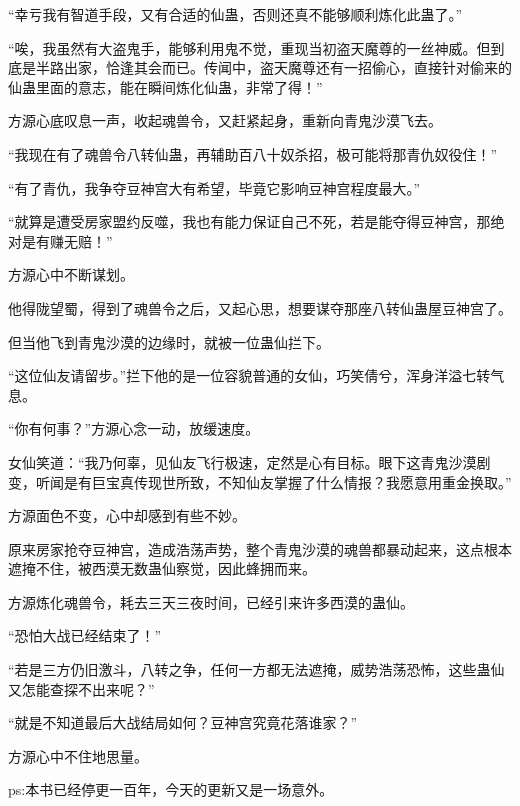 \begin{this_body}
“幸亏我有智道手段，又有合适的仙蛊，否则还真不能够顺利炼化此蛊了。”

“唉，我虽然有大盗鬼手，能够利用鬼不觉，重现当初盗天魔尊的一丝神威。但到底是半路出家，恰逢其会而已。传闻中，盗天魔尊还有一招偷心，直接针对偷来的仙蛊里面的意志，能在瞬间炼化仙蛊，非常了得！”

方源心底叹息一声，收起魂兽令，又赶紧起身，重新向青鬼沙漠飞去。

“我现在有了魂兽令八转仙蛊，再辅助百八十奴杀招，极可能将那青仇奴役住！”

“有了青仇，我争夺豆神宫大有希望，毕竟它影响豆神宫程度最大。”

“就算是遭受房家盟约反噬，我也有能力保证自己不死，若是能夺得豆神宫，那绝对是有赚无赔！”

方源心中不断谋划。

他得陇望蜀，得到了魂兽令之后，又起心思，想要谋夺那座八转仙蛊屋豆神宫了。

但当他飞到青鬼沙漠的边缘时，就被一位蛊仙拦下。

“这位仙友请留步。”拦下他的是一位容貌普通的女仙，巧笑倩兮，浑身洋溢七转气息。

“你有何事？”方源心念一动，放缓速度。

女仙笑道：“我乃何辜，见仙友飞行极速，定然是心有目标。眼下这青鬼沙漠剧变，听闻是有巨宝真传现世所致，不知仙友掌握了什么情报？我愿意用重金换取。”

方源面色不变，心中却感到有些不妙。

原来房家抢夺豆神宫，造成浩荡声势，整个青鬼沙漠的魂兽都暴动起来，这点根本遮掩不住，被西漠无数蛊仙察觉，因此蜂拥而来。

方源炼化魂兽令，耗去三天三夜时间，已经引来许多西漠的蛊仙。

“恐怕大战已经结束了！”

“若是三方仍旧激斗，八转之争，任何一方都无法遮掩，威势浩荡恐怖，这些蛊仙又怎能查探不出来呢？”

“就是不知道最后大战结局如何？豆神宫究竟花落谁家？”

方源心中不住地思量。

ps:本书已经停更一百年，今天的更新又是一场意外。

\end{this_body}

